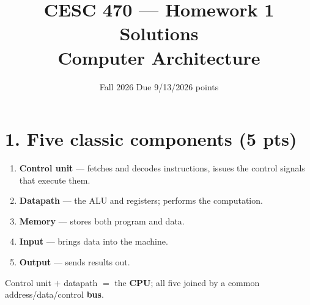 



\title{\vspace{-1.5cm}CESC 470 --- Homework 1 Solutions\\
       {\large Computer Architecture}}
\author{}
\date{Fall 2026 \quad\textbullet\quad Due 9/13/2026 \quad\textbullet{} points}


\maketitle
\vspace{-1.0cm}

\section*{1. Five classic components \normalsize(5 pts)}

\begin{enumerate}[nosep, leftmargin=1.6em]
  \item \textbf{Control unit} — fetches and decodes instructions, issues the
    control signals that execute them.
  \item \textbf{Datapath} — the ALU and registers; performs the computation.
  \item \textbf{Memory} — stores both program and data.
  \item \textbf{Input} — brings data into the machine.
  \item \textbf{Output} — sends results out.
\end{enumerate}
Control unit $+$ datapath $=$ the \textbf{CPU}; all five joined by a common
address/data/control \textbf{bus}.

